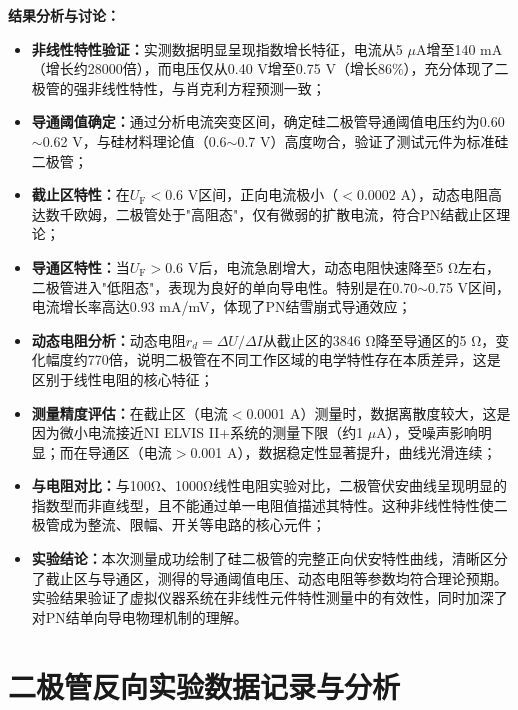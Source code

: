 \documentclass[11pt]{article}
\begin{document}
\noindent\textbf{结果分析与讨论：}
\begin{itemize}[leftmargin=2em,itemsep=2pt,parsep=0.5ex]
    \item \textbf{非线性特性验证：}实测数据明显呈现指数增长特征，电流从5 $\mu$A增至140 mA（增长约28000倍），而电压仅从0.40 V增至0.75 V（增长86\%），充分体现了二极管的强非线性特性，与肖克利方程预测一致；
    
    \item \textbf{导通阈值确定：}通过分析电流突变区间，确定硅二极管导通阈值电压约为0.60$\sim$0.62 V，与硅材料理论值（0.6$\sim$0.7 V）高度吻合，验证了测试元件为标准硅二极管；
    
    \item \textbf{截止区特性：}在$U_{\text{F}} < 0.6$ V区间，正向电流极小（$<$0.0002 A），动态电阻高达数千欧姆，二极管处于"高阻态"，仅有微弱的扩散电流，符合PN结截止区理论；
    
    \item \textbf{导通区特性：}当$U_{\text{F}} > 0.6$ V后，电流急剧增大，动态电阻快速降至5 Ω左右，二极管进入"低阻态"，表现为良好的单向导电性。特别是在0.70$\sim$0.75 V区间，电流增长率高达0.93 mA/mV，体现了PN结雪崩式导通效应；
    
    \item \textbf{动态电阻分析：}动态电阻$r_d = \Delta U/\Delta I$从截止区的3846 Ω降至导通区的5 Ω，变化幅度约770倍，说明二极管在不同工作区域的电学特性存在本质差异，这是区别于线性电阻的核心特征；
    
    \item \textbf{测量精度评估：}在截止区（电流$<$0.0001 A）测量时，数据离散度较大，这是因为微小电流接近NI ELVIS II+系统的测量下限（约1 $\mu$A），受噪声影响明显；而在导通区（电流$>$0.001 A），数据稳定性显著提升，曲线光滑连续；
    
    \item \textbf{与电阻对比：}与100Ω、1000Ω线性电阻实验对比，二极管伏安曲线呈现明显的指数型而非直线型，且不能通过单一电阻值描述其特性。这种非线性特性使二极管成为整流、限幅、开关等电路的核心元件；
    
    \item \textbf{实验结论：}本次测量成功绘制了硅二极管的完整正向伏安特性曲线，清晰区分了截止区与导通区，测得的导通阈值电压、动态电阻等参数均符合理论预期。实验结果验证了虚拟仪器系统在非线性元件特性测量中的有效性，同时加深了对PN结单向导电物理机制的理解。
\end{itemize}

\section{二极管反向实验数据记录与分析}
\end{document}
